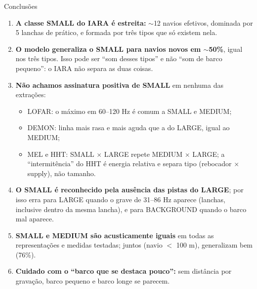 \documentclass[aspectratio=169]{beamer}
\begin{document}
\begin{frame}{Conclusões}
    \scriptsize
    \begin{enumerate}
        \setlength{\itemsep}{2pt}
        \item \textbf{A classe SMALL do IARA é estreita:} $\sim$12 navios efetivos, dominada por 5 lanchas de prático, e formada por três tipos que só existem nela.
        \item \textbf{O modelo generaliza o SMALL para navios novos em $\sim$50\%}, igual nos três tipos. Isso pode ser ``som desses tipos'' e não ``som de barco pequeno'': o IARA não separa as duas coisas.
        \item \textbf{Não achamos assinatura positiva de SMALL} em nenhuma das extrações:
        \begin{itemize}\scriptsize
            \item LOFAR: o máximo em 60--120 Hz é comum a SMALL e MEDIUM;
            \item DEMON: linha mais rasa e mais aguda que a do LARGE, igual ao MEDIUM;
            \item MEL e HHT: SMALL $\times$ LARGE repete MEDIUM $\times$ LARGE; a ``intermitência'' do HHT é energia relativa e separa tipo (rebocador $\times$ supply), não tamanho.
        \end{itemize}
        \item \textbf{O SMALL é reconhecido pela ausência das pistas do LARGE}; por isso erra para LARGE quando o grave de 31--86 Hz aparece (lanchas, inclusive dentro da mesma lancha), e para BACKGROUND quando o barco mal aparece.
        \item \textbf{SMALL e MEDIUM são acusticamente iguais} em todas as representações e medidas testadas; juntos (navio $<$ 100 m), generalizam bem (76\%).
        \item \textbf{Cuidado com o ``barco que se destaca pouco'':} sem distância por gravação, barco pequeno e barco longe se parecem.
    \end{enumerate}
\end{frame}
\end{document}
